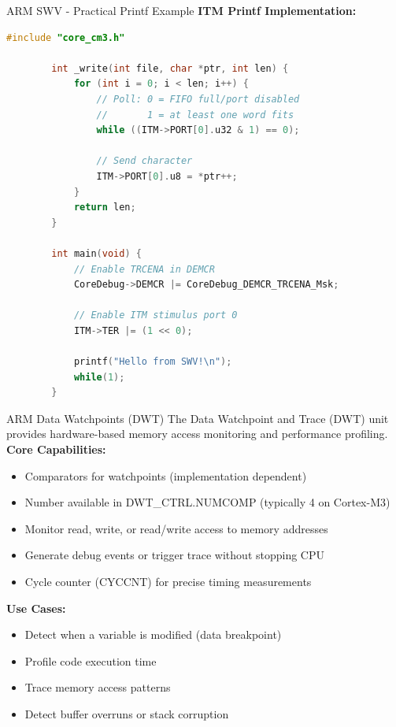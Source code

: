 \documentclass{beamer}
\begin{document}
\begin{frame}[fragile]{ARM}
	{SWV - Practical Printf Example}
	\textbf{ITM Printf Implementation:}
	\begin{lstlisting}[language=C, basicstyle=\ttfamily\tiny]
		#include "core_cm3.h"
		
		int _write(int file, char *ptr, int len) {
			for (int i = 0; i < len; i++) {
				// Poll: 0 = FIFO full/port disabled
				//       1 = at least one word fits
				while ((ITM->PORT[0].u32 & 1) == 0);
				
				// Send character
				ITM->PORT[0].u8 = *ptr++;
			}
			return len;
		}
		
		int main(void) {
			// Enable TRCENA in DEMCR
			CoreDebug->DEMCR |= CoreDebug_DEMCR_TRCENA_Msk;
			
			// Enable ITM stimulus port 0
			ITM->TER |= (1 << 0);
			
			printf("Hello from SWV!\n");
			while(1);
		}
	\end{lstlisting}
\end{frame}

\begin{frame}{ARM}
	{Data Watchpoints (DWT)}
	The Data Watchpoint and Trace (DWT) unit provides hardware-based memory access monitoring and performance profiling.\\
	\smallskip
	\textbf{Core Capabilities:}
	\begin{itemize}
		\item Comparators for watchpoints (implementation dependent)
		\item Number available in DWT\_CTRL.NUMCOMP (typically 4 on Cortex-M3)
		\item Monitor read, write, or read/write access to memory addresses
		\item Generate debug events or trigger trace without stopping CPU
		\item Cycle counter (CYCCNT) for precise timing measurements
	\end{itemize}
	\smallskip
	\textbf{Use Cases:}
	\begin{itemize}
		\item Detect when a variable is modified (data breakpoint)
		\item Profile code execution time
		\item Trace memory access patterns
		\item Detect buffer overruns or stack corruption
	\end{itemize}
\end{frame}
\end{document}
